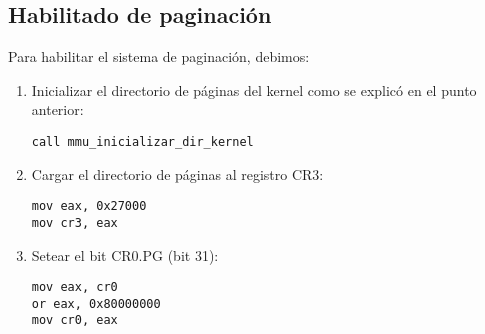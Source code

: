 	\subsection{Habilitado de paginación}

	Para habilitar el sistema de paginación, debimos:

	\lstset{escapechar=@,style=asm}
	\begin{enumerate}

		\item Inicializar el directorio de páginas del kernel como se explicó en el punto anterior:

		\begin{lstlisting}
call mmu_inicializar_dir_kernel
		\end{lstlisting}

		\item Cargar el directorio de páginas al registro CR3:

		\begin{lstlisting}
mov eax, 0x27000
mov cr3, eax
		\end{lstlisting}

		\item Setear el bit CR0.PG (bit 31):

		\begin{lstlisting}
mov eax, cr0
or eax, 0x80000000
mov cr0, eax
		\end{lstlisting}

	\end{enumerate}